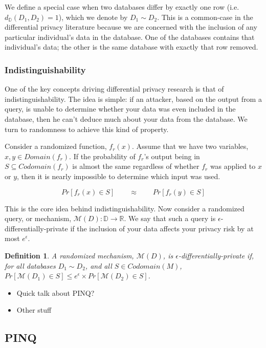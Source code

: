\documentclass[12pt]{article}
\newtheorem{defn}{Definition}[section]
\begin{document}
We define a special case when two databases differ by exactly one row (i.e. $d_\mathbb{D}(D_1,D_2)=1$), which we denote by $D_1 \sim D_2$.
This is a common-case in the differential privacy literature because we are concerned with the inclusion of any particular individual's data in the database.
One of the databases contains that individual's data; the other is the same database with exactly that row removed.

\subsubsection{Indistinguishability}

One of the key concepts driving differential privacy research is that of indistinguishability.
The idea is simple: if an attacker, based on the output from a query, is unable to determine whether your data was even included in the database, then he can't deduce much about your data from the database.
We turn to randomness to achieve this kind of property.

Consider a randomized function, $f_r(x)$.
Assume that we have two variables, $x, y \in Domain(f_r)$.
If the probability of $f_r$'s output being in $S \subseteq Codomain(f_r)$ is almost the same regardless of whether $f_r$ was applied to $x$ or $y$, then it is nearly impossible to determine which input was used.

\[
  Pr[f_r(x)\in S] \qquad\approx\qquad  Pr[f_r(y)\in S]
\]

This is the core idea behind indistinguishability.
Now consider a randomized query, or mechanism, $\mathcal{M}(D) : \mathbb{D} \rightarrow \mathbb{R}$.
We say that such a query is $\epsilon$-differentially-private if the inclusion of your data affects your privacy risk by at most $e^\epsilon$.

\begin{defn}\label{def:diffpriv}
  A randomized mechanism, $\mathcal{M}(D)$, is $\epsilon$-differentially-private if, for all databases $D_1 \sim D_2$, and all $S \in Codomain(M)$,
  $Pr[\mathcal{M}(D_1)\in S] \le e^\epsilon \times Pr[\mathcal{M}(D_2)\in S]$.
\end{defn}

\begin{itemize}
  \item Quick talk about PINQ?
  \item Other stuff
\end{itemize}

\subsection{PINQ}\label{sec:pinq}
\end{document}
